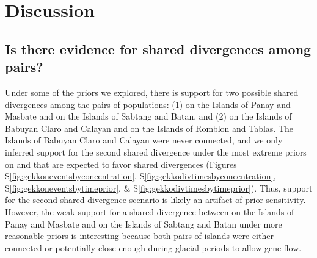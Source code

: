 \ifembed{

}{}

\ifembed{

}{}




\section{Discussion}

\subsection{Is there evidence for shared divergences among  pairs?}

Under some of the priors we explored, there is support for two possible shared
divergences among the pairs of  populations:
(1)
 on the Islands of Panay and Masbate
and
 on the Islands of Sabtang and Batan,
and (2)
 on the Islands of Babuyan Claro and Calayan
and
 on the Islands of Romblon and Tablas.
The Islands of Babuyan Claro and Calayan were never connected,
and we only inferred support for the second shared divergence
under the most extreme priors on \concentration and
\divtime that are expected to favor shared divergences
(Figures
S\ref{fig:gekkoneventsbyconcentration},
S\ref{fig:gekkodivtimesbyconcentration},
S\ref{fig:gekkoneventsbytimeprior},
\&
S\ref{fig:gekkodivtimesbytimeprior}).
Thus, support for the second shared divergence scenario is likely an
artifact of prior sensitivity.
However, the weak support for a shared divergence between
 on the Islands of Panay and Masbate
and
 on the Islands of Sabtang and Batan
under more reasonable priors is interesting because both pairs of islands were
either connected or potentially close enough during glacial periods to allow
gene flow.


